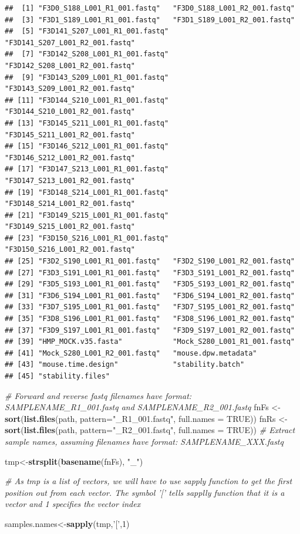 \documentclass[
]{book}
\newenvironment{Shaded}{\begin{snugshade}}{\end{snugshade}}
\newcommand{\CommentTok}[1]{\textcolor[rgb]{0.56,0.35,0.01}{\textit{#1}}}
\newcommand{\DataTypeTok}[1]{\textcolor[rgb]{0.13,0.29,0.53}{#1}}
\newcommand{\DecValTok}[1]{\textcolor[rgb]{0.00,0.00,0.81}{#1}}
\newcommand{\KeywordTok}[1]{\textcolor[rgb]{0.13,0.29,0.53}{\textbf{#1}}}
\newcommand{\NormalTok}[1]{#1}
\newcommand{\OtherTok}[1]{\textcolor[rgb]{0.56,0.35,0.01}{#1}}
\newcommand{\StringTok}[1]{\textcolor[rgb]{0.31,0.60,0.02}{#1}}
\begin{document}
\begin{verbatim}
##  [1] "F3D0_S188_L001_R1_001.fastq"   "F3D0_S188_L001_R2_001.fastq"  
##  [3] "F3D1_S189_L001_R1_001.fastq"   "F3D1_S189_L001_R2_001.fastq"  
##  [5] "F3D141_S207_L001_R1_001.fastq" "F3D141_S207_L001_R2_001.fastq"
##  [7] "F3D142_S208_L001_R1_001.fastq" "F3D142_S208_L001_R2_001.fastq"
##  [9] "F3D143_S209_L001_R1_001.fastq" "F3D143_S209_L001_R2_001.fastq"
## [11] "F3D144_S210_L001_R1_001.fastq" "F3D144_S210_L001_R2_001.fastq"
## [13] "F3D145_S211_L001_R1_001.fastq" "F3D145_S211_L001_R2_001.fastq"
## [15] "F3D146_S212_L001_R1_001.fastq" "F3D146_S212_L001_R2_001.fastq"
## [17] "F3D147_S213_L001_R1_001.fastq" "F3D147_S213_L001_R2_001.fastq"
## [19] "F3D148_S214_L001_R1_001.fastq" "F3D148_S214_L001_R2_001.fastq"
## [21] "F3D149_S215_L001_R1_001.fastq" "F3D149_S215_L001_R2_001.fastq"
## [23] "F3D150_S216_L001_R1_001.fastq" "F3D150_S216_L001_R2_001.fastq"
## [25] "F3D2_S190_L001_R1_001.fastq"   "F3D2_S190_L001_R2_001.fastq"  
## [27] "F3D3_S191_L001_R1_001.fastq"   "F3D3_S191_L001_R2_001.fastq"  
## [29] "F3D5_S193_L001_R1_001.fastq"   "F3D5_S193_L001_R2_001.fastq"  
## [31] "F3D6_S194_L001_R1_001.fastq"   "F3D6_S194_L001_R2_001.fastq"  
## [33] "F3D7_S195_L001_R1_001.fastq"   "F3D7_S195_L001_R2_001.fastq"  
## [35] "F3D8_S196_L001_R1_001.fastq"   "F3D8_S196_L001_R2_001.fastq"  
## [37] "F3D9_S197_L001_R1_001.fastq"   "F3D9_S197_L001_R2_001.fastq"  
## [39] "HMP_MOCK.v35.fasta"            "Mock_S280_L001_R1_001.fastq"  
## [41] "Mock_S280_L001_R2_001.fastq"   "mouse.dpw.metadata"           
## [43] "mouse.time.design"             "stability.batch"              
## [45] "stability.files"
\end{verbatim}

\begin{Shaded}
\begin{Highlighting}[]
\CommentTok{# Forward and reverse fastq filenames have format: SAMPLENAME_R1_001.fastq and SAMPLENAME_R2_001.fastq}
\NormalTok{fnFs <-}\StringTok{ }\KeywordTok{sort}\NormalTok{(}\KeywordTok{list.files}\NormalTok{(path, }\DataTypeTok{pattern=}\StringTok{"_R1_001.fastq"}\NormalTok{, }\DataTypeTok{full.names =} \OtherTok{TRUE}\NormalTok{))}
\NormalTok{fnRs <-}\StringTok{ }\KeywordTok{sort}\NormalTok{(}\KeywordTok{list.files}\NormalTok{(path, }\DataTypeTok{pattern=}\StringTok{"_R2_001.fastq"}\NormalTok{, }\DataTypeTok{full.names =} \OtherTok{TRUE}\NormalTok{))}
\CommentTok{# Extract sample names, assuming filenames have format: SAMPLENAME_XXX.fastq}


\NormalTok{tmp<-}\KeywordTok{strsplit}\NormalTok{(}\KeywordTok{basename}\NormalTok{(fnFs), }\StringTok{"_"}\NormalTok{)}


\CommentTok{# As tmp is a list of vectors, we will have to use sapply function to get the first position out from each vector. The symbol '[' tells sapplly function that it is a vector and 1 specifies the vector index}

\NormalTok{samples.names<-}\KeywordTok{sapply}\NormalTok{(tmp,}\StringTok{'['}\NormalTok{,}\DecValTok{1}\NormalTok{)}
\end{Highlighting}
\end{Shaded}
\end{document}
